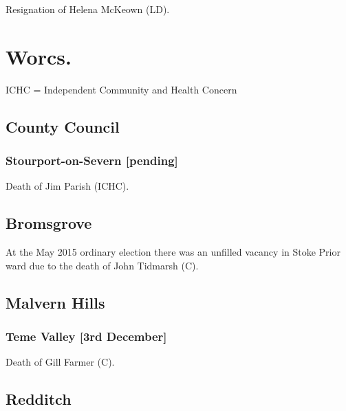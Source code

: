 \documentclass[a4paper,openany]{book}
\begin{document}
\begin{resultsiii}

Resignation of Helena McKeown (LD).

\section[Worcestershire]{Worcs.}

ICHC = Independent Community and Health Concern

\subsection*{County Council}

\subsubsection*{Stourport-on-Severn \hspace*{\fill}\nolinebreak[1]%
\enspace\hspace*{\fill}
[pending]}


Death of Jim Parish (ICHC).

\subsection*{Bromsgrove}

At the May 2015 ordinary election there was an unfilled vacancy in Stoke Prior ward due to the death of John Tidmarsh (C).

\subsection*{Malvern Hills}

\subsubsection*{Teme Valley \hspace*{\fill}\nolinebreak[1]%
\enspace\hspace*{\fill}
[3rd December]}


Death of Gill Farmer (C).

\subsection*{Redditch}


\end{resultsiii}
\end{document}
